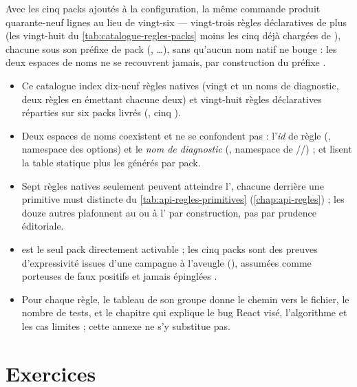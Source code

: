 Avec les cinq packs  ajoutés à la configuration, la même commande produit quarante-neuf lignes au lieu de vingt-six --- vingt-trois règles déclaratives de plus (les vingt-huit du \cref{tab:catalogue-regles-packs} moins les cinq déjà chargées de ), chacune sous son préfixe de pack (, \ldots), sans qu'aucun nom natif ne bouge : les deux espaces de noms ne se recouvrent jamais, par construction du préfixe .

\begin{resume}
\begin{itemize}
  \item Ce catalogue index dix-neuf règles natives (vingt et un noms de diagnostic, deux règles en émettant chacune deux) et vingt-huit règles déclaratives réparties sur six packs livrés (, cinq ).
  \item Deux espaces de noms coexistent et ne se confondent pas : l'\emph{id} de règle (, namespace des options) et le \emph{nom de diagnostic} (, namespace de //) ;  et  lisent la table statique  plus les  générés par pack.
  \item Sept règles natives seulement peuvent atteindre l'\Error, chacune derrière une primitive must distincte du \cref{tab:api-regles-primitives} (\cref{chap:api-regles}) ; les douze autres plafonnent au \Warning{} ou à l'\Info{} par construction, pas par prudence éditoriale.
  \item {} est le seul pack directement activable ; les cinq packs  sont des preuves d'expressivité issues d'une campagne à l'aveugle (), assumées comme porteuses de faux positifs et jamais épinglées .
  \item Pour chaque règle, le tableau de son groupe donne le chemin vers le fichier, le nombre de tests, et le chapitre qui explique le bug React visé, l'algorithme et les cas limites ; cette annexe ne s'y substitue pas.
\end{itemize}
\end{resume}

\section{Exercices}
\label{sec:catalogue-regles-exercices}

